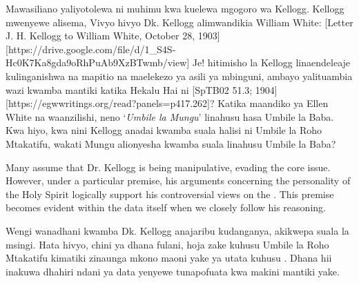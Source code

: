 Mawasiliano yaliyotolewa ni muhimu kwa kuelewa mgogoro wa Kellogg. Kellogg mwenyewe alisema,  Vivyo hivyo Dk. Kellogg alimwandikia William White: [Letter J. H. Kellogg to William White, October 28, 1903][https://drive.google.com/file/d/1\_S4S-Hc0K7Ka8gda9oRhPuAb9XzBTwmb/view] Je! hitimisho la Kellogg linaendeleaje kulinganishwa na mapitio na maelekezo ya asili ya mbinguni, ambayo yalituambia wazi kwamba mantiki katika Hekalu Hai ni [SpTB02 51.3; 1904][https://egwwritings.org/read?panels=p417.262]? Katika maandiko ya Ellen White na waanzilishi, neno ‘\textit{Umbile la Mungu}’ linahusu hasa Umbile la Baba. Kwa hiyo, kwa nini Kellogg anadai kwamba suala halisi ni Umbile la Roho Mtakatifu, wakati Mungu alionyesha kwamba suala linahusu Umbile la Baba?


Many assume that Dr. Kellogg is being manipulative, evading the core issue. However, under a particular premise, his arguments concerning the personality of the Holy Spirit logically support his controversial views on the . This premise becomes evident within the data itself when we closely follow his reasoning.


Wengi wanadhani kwamba Dk. Kellogg anajaribu kudanganya, akikwepa suala la msingi. Hata hivyo, chini ya dhana fulani, hoja zake kuhusu Umbile la Roho Mtakatifu kimatiki zinaunga mkono maoni yake ya utata kuhusu . Dhana hii inakuwa dhahiri ndani ya data yenyewe tunapofuata kwa makini mantiki yake.


